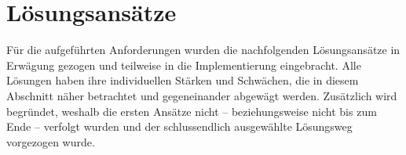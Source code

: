 \section{Lösungsansätze}
\label{sec:e_loesungsansaetze}

Für die aufgeführten Anforderungen wurden die nachfolgenden Lösungsansätze in
Erwägung gezogen und teilweise in die Implementierung eingebracht.  Alle
Lösungen haben ihre individuellen Stärken und Schwächen, die in diesem
Abschnitt näher betrachtet und gegeneinander abgewägt werden.  Zusätzlich wird
begründet, weshalb die ersten Ansätze nicht -- beziehungsweise nicht bis zum
Ende -- verfolgt wurden und der schlussendlich ausgewählte Lösungsweg
vorgezogen wurde.






